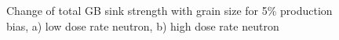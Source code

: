 \documentclass[a4paper]{article}
\begin{document}
      \begin{figure}[h!]  %
        \centering
        \qquad
        \caption{Change of total GB sink strength with grain size for 5\% production bias, a) low dose rate neutron, b) high dose rate neutron}
        \label{figure:sink_strengths_neutron_5_1e-3}
      \end{figure}
\end{document}
